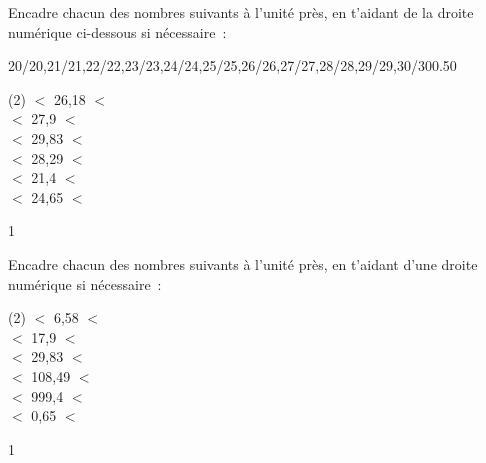 \documentclass[a4paper,11pt]{report}
\begin{document}
\begin{exop}
{Encadre chacun des nombres suivants à l'unité près, en t'aidant de la droite numérique ci-dessous si nécessaire~:
\begin{center}
\vspace*{0.2cm}
\begin{numberlined}{20}{30}{1}{0.1}{20/20,21/21,22/22,23/23,24/24,25/25,26/26,27/27,28/28,29/29,30/30}{0.5}{0}{}\end{numberlined}
\vspace*{0.2cm}
\end{center}
\begin{tasks}[after-item-skip = 0.1em, after-skip=-2em](2)
\task \makebox[.8in]{\hrulefill} $<$ 26,18 $<$ \makebox[.8in]{\hrulefill}\\
\task \makebox[.8in]{\hrulefill} $<$ 27,9 $<$ \makebox[.8in]{\hrulefill}\\
\task \makebox[.8in]{\hrulefill} $<$ 29,83 $<$ \makebox[.8in]{\hrulefill}\\
\task \makebox[.8in]{\hrulefill} $<$ 28,29 $<$ \makebox[.8in]{\hrulefill}\\
\task \makebox[.8in]{\hrulefill} $<$ 21,4 $<$ \makebox[.8in]{\hrulefill}\\
\task \makebox[.8in]{\hrulefill} $<$ 24,65 $<$ \makebox[.8in]{\hrulefill}
\end{tasks}
}{1}
\end{exop}



\begin{exop}{
Encadre chacun des nombres suivants à l'unité près, en t'aidant d'une droite numérique si nécessaire~:
\begin{tasks}[after-item-skip = 0.15em, after-skip=-2em](2)
\task \makebox[.8in]{\hrulefill} $<$ 6,58 $<$ \makebox[.8in]{\hrulefill}\\
\task \makebox[.8in]{\hrulefill} $<$ 17,9 $<$ \makebox[.8in]{\hrulefill}\\
\task \makebox[.8in]{\hrulefill} $<$ 29,83 $<$ \makebox[.8in]{\hrulefill}\\
\task \makebox[.8in]{\hrulefill} $<$ 108,49 $<$ \makebox[.8in]{\hrulefill}\\
\task \makebox[.8in]{\hrulefill} $<$ 999,4 $<$ \makebox[.8in]{\hrulefill}\\
\task \makebox[.8in]{\hrulefill} $<$ 0,65 $<$ \makebox[.8in]{\hrulefill}
\end{tasks}
}{1}\end{exop}
\end{document}
